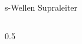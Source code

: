\begin{frame}{s-Wellen Supraleiter}
\begin{columns}
        \begin{column}{0.5\linewidth}
        \end{column}
    \end{columns}
\end{frame}


